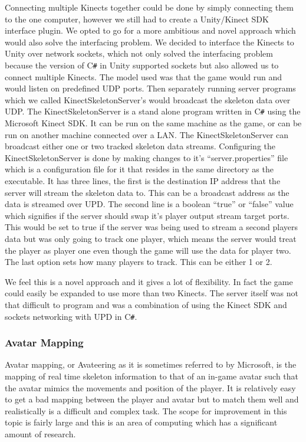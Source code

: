 \documentclass[a4paper,oneside]{memoir}
\begin{document}
				Connecting multiple Kinects together could be done by simply connecting them to the one computer, however we still had to create a Unity/Kinect SDK interface plugin.
				We opted to go for a more ambitious and novel approach which would also solve the interfacing problem.
				We decided to interface the Kinects to Unity over network sockets, which not only solved the interfacing problem because the version of C\texttt{\#} in Unity supported sockets but also allowed us to connect multiple Kinects.
				The model used was that the game would run and would listen on predefined UDP ports.
				Then separately running server programs which we called KinectSkeletonServer's would broadcast the skeleton data over UDP.
				The KinectSkeletonServer is a stand alone program written in C\texttt{\#} using the Microsoft Kinect SDK.
				It can be run on the same machine as the game, or can be run on another machine connected over a LAN.
				The KinectSkeletonServer can broadcast either one or two tracked skeleton data streams.
				Configuring the KinectSkeletonServer is done by making changes to it's ``server.properties'' file which is a configuration file for it that resides in the same directory as the executable.
				It has three lines, the first is the destination IP address that the server will stream the skeleton data to.
				This can be a broadcast address as the data is streamed over UPD.
				The second line is a boolean ``true'' or ``false'' value which signifies if the server should swap it's player output stream target ports.
				This would be set to true if the server was being used to stream a second players data but was only going to track one player, which means the server would treat the player as player one even though the game will use the data for player two.
				The last option sets how many players to track.
				This can be either 1 or 2.

				We feel this is a novel approach and it gives a lot of flexibility.
				In fact the game could easily be expanded to use more than two Kinects.
				The server itself was not that difficult to program and was a combination of using the Kinect SDK and sockets networking with UPD in C\texttt{\#}.

			\subsubsection{Avatar Mapping}
				
				Avatar mapping, or Avateering as it is sometimes referred to by Microsoft, is the mapping of real time skeleton information to that of an in-game avatar such that the avatar mimics the movements and position of the player.
				It is relatively easy to get a bad mapping between the player and avatar but to match them well and realistically is a difficult and complex task.
				The scope for improvement in this topic is fairly large and this is an area of computing which has a significant amount of research.
\end{document}
